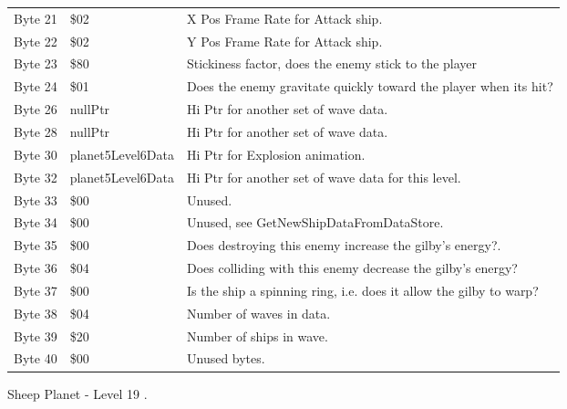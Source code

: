 \begin{figure}[H]
{\begin{adjustbox}{width=12cm}
\begin{tabular}{lll}
 Byte 21 & \$02                & X Pos Frame Rate for Attack ship.                                  \\
 Byte 22 & \$02                & Y Pos Frame Rate for Attack ship.                                  \\
 Byte 23 & \$80                & Stickiness factor, does the enemy stick to the player              \\
 Byte 24 & \$01                & Does the enemy gravitate quickly toward the player when its hit?   \\
 Byte 26 & nullPtr            & Hi Ptr for another set of wave data.                               \\
 Byte 28 & nullPtr            & Hi Ptr for another set of wave data.                               \\
 Byte 30 & planet5Level6Data  & Hi Ptr for Explosion animation.                                    \\
 Byte 32 & planet5Level6Data  & Hi Ptr for another set of wave data for this level.                \\
 Byte 33 & \$00                & Unused.                                                            \\
 Byte 34 & \$00                & Unused, see GetNewShipDataFromDataStore.                           \\
 Byte 35 & \$00                & Does destroying this enemy increase the gilby's energy?.           \\
 Byte 36 & \$04                & Does colliding with this enemy decrease the gilby's energy?        \\
 Byte 37 & \$00                & Is the ship a spinning ring, i.e. does it allow the gilby to warp? \\
 Byte 38 & \$04                & Number of waves in data.                                           \\
 Byte 39 & \$20                & Number of ships in wave.                                           \\
 Byte 40 & \$00                & Unused bytes.                                                      \\
\bottomrule
\end{tabular}

  \end{adjustbox}

  }\caption*{Sheep Planet - Level 19
.}
\end{figure}

